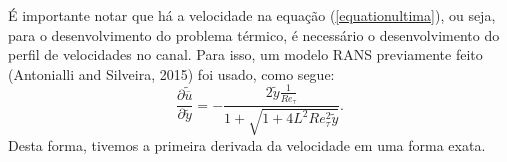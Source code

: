 É importante notar que há a velocidade na equação (\ref{equationultima}), ou seja, para o desenvolvimento do problema térmico, é necessário o desenvolvimento do perfil de velocidades no canal. Para isso, um modelo RANS previamente feito (Antonialli and Silveira, 2015) foi usado, como segue:
\begin{equation}\label{finalequationvelocity}	
\frac{\partial \tilde{\overline{u}}}{\partial \tilde{y}} = - \frac{2 \tilde{y} \frac{1}{Re_\tau} }{ 1 + \sqrt{ 1 + 4 L ^2 Re_\tau ^2 \tilde{y}}}.
\end{equation}	
Desta forma, tivemos a primeira derivada da velocidade em uma forma exata.

